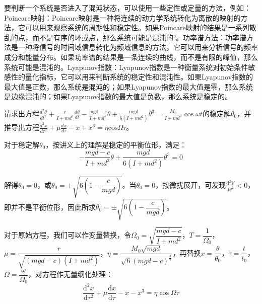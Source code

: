要判断一个系统是否进入了混沌状态，可以使用一些定性或定量的方法，例如：Poincare映射：Poincare映射是一种将连续的动力学系统转化为离散的映射的方法，它可以用来观察系统的周期性和稳定性。如果Poincare映射的结果是一系列散乱的点，而不是有序的环或点，那么系统可能是混沌的²。功率谱方法：功率谱方法是一种将信号的时间域信息转化为频域信息的方法，它可以用来分析信号的频率成分和能量分布。如果功率谱的结果是一条连续的曲线，而不是有限的峰值，那么系统可能是混沌的。Lyapunov指数：Lyapunov指数是一种衡量系统对初始条件敏感性的量化指标，它可以用来判断系统的稳定性和混沌性。如果Lyapunov指数的最大值是正数，那么系统是混沌的；如果Lyapunov指数的最大值是零，那么系统是边缘混沌的；如果Lyapunov指数的最大值是负数，那么系统是稳定的。

\begin{question}
	请求出方程$\frac{d^2\theta}{dt^2}+\frac r{I+md^2}\frac{d\theta}{dt}-\frac{\mathrm{mgd-c}}{I+md^2}\theta+\frac{\mathrm{mgd}}{6(I+md^2)}\theta^3=\frac{M_0}{I+md^2}\cos\omega t$的稳定解$\theta_0$，并推导出方程$\frac{d^2x}{d\tau^2}+\mu\frac{dx}{d\tau}-x+x^3=\eta\mathrm{cos}\Omega\tau$。
\end{question}
对于稳定解$\theta_0$，按讲义上的理解是稳定的平衡位形，满足：
\[-\dfrac{mgd-c}{I+md^2}\theta+\dfrac{mgd}{6(I+md^2)}\theta^3=0\]

解得$\theta_0=0$，或$\theta_0=\pm\sqrt{6(1-\dfrac{c}{mgd})}$。当$\theta_0=0$，按微扰展开，可发现$\frac{\mathrm{d}^2V }{\mathrm{d} \theta^2}<0$，即并不是平衡位形，因此所求$\theta_0=\pm\sqrt{6(1-\dfrac{c}{mgd})}$。

对于原始方程，我们可以作变量替换，令$\Omega_0=\sqrt{\dfrac{mgd-c}{I+md^2}}$，$T=\dfrac{1}{\Omega_0}$，$\mu=\dfrac{r}{\sqrt{(mgd-c)(I+md^2)}}$，$\eta=\dfrac{M_0\sqrt{mgd}}{\sqrt{6}(mgd-c)^{\frac{3}{2}}}$，再替换$x=\dfrac{\theta}{\theta_0}$，$\tau=\dfrac{t}{t_0}$，$\Omega=\dfrac{\omega}{\Omega_0}$，对方程作无量纲化处理：
\[\frac{\mathrm{d}^2x }{\mathrm{d} \tau^2}+\mu\frac{\mathrm{d}x }{\mathrm{d} \tau}-x-x^3=\eta\cos\Omega\tau\]


